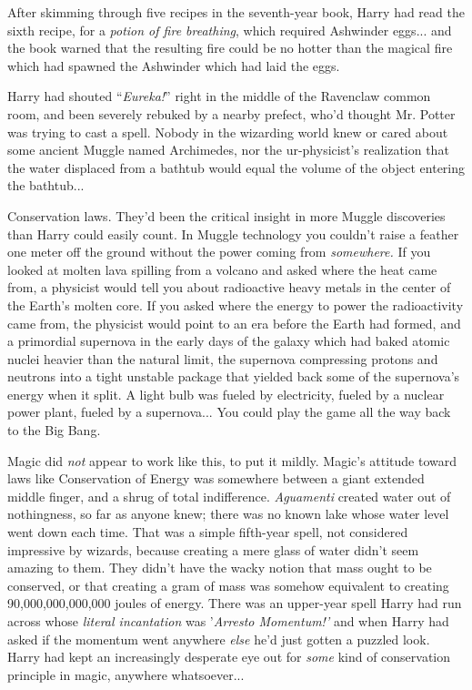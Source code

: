 After skimming through five recipes in the seventh-year book, Harry had read the sixth recipe, for a \emph{potion of fire breathing}, which required Ashwinder eggs... and the book warned that the resulting fire could be no hotter than the magical fire which had spawned the Ashwinder which had laid the eggs.

Harry had shouted ``\emph{Eureka!}'' right in the middle of the Ravenclaw common room, and been severely rebuked by a nearby prefect, who'd thought Mr. Potter was trying to cast a spell. Nobody in the wizarding world knew or cared about some ancient Muggle named Archimedes, nor the ur-physicist's realization that the water displaced from a bathtub would equal the volume of the object entering the bathtub...

Conservation laws. They'd been the critical insight in more Muggle discoveries than Harry could easily count. In Muggle technology you couldn't raise a feather one meter off the ground without the power coming from \emph{somewhere.} If you looked at molten lava spilling from a volcano and asked where the heat came from, a physicist would tell you about radioactive heavy metals in the center of the Earth's molten core. If you asked where the energy to power the radioactivity came from, the physicist would point to an era before the Earth had formed, and a primordial supernova in the early days of the galaxy which had baked atomic nuclei heavier than the natural limit, the supernova compressing protons and neutrons into a tight unstable package that yielded back some of the supernova's energy when it split. A light bulb was fueled by electricity, fueled by a nuclear power plant, fueled by a supernova... You could play the game all the way back to the Big Bang.

Magic did \emph{not} appear to work like this, to put it mildly. Magic's attitude toward laws like Conservation of Energy was somewhere between a giant extended middle finger, and a shrug of total indifference. \emph{Aguamenti} created water out of nothingness, so far as anyone knew; there was no known lake whose water level went down each time. That was a simple fifth-year spell, not considered impressive by wizards, because creating a mere glass of water didn't seem amazing to them. They didn't have the wacky notion that mass ought to be conserved, or that creating a gram of mass was somehow equivalent to creating 90,000,000,000,000 joules of energy. There was an upper-year spell Harry had run across whose \emph{literal incantation} was '\emph{Arresto Momentum!'} and when Harry had asked if the momentum went anywhere \emph{else} he'd just gotten a puzzled look. Harry had kept an increasingly desperate eye out for \emph{some} kind of conservation principle in magic, anywhere whatsoever...

